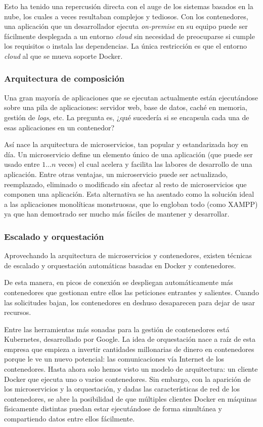 Esto ha tenido una repercusión directa con el auge de los sistemas basados en la
nube, los cuales a veces resultaban complejos y tediosos. Con los contenedores, una
aplicación que un desarrollador ejecuta \textit{on-premise} en su equipo puede
ser fácilmente desplegada a un entorno \textit{cloud} sin necesidad de preocuparse
si cumple los requisitos o instala las dependencias. La única restricción es que el
entorno \textit{cloud} al que se mueva soporte Docker.

\subsubsection*{Arquitectura de composición}
Una gran mayoría de aplicaciones que se ejecutan actualmente están ejecutándose sobre
una pila de aplicaciones: servidor web, base de datos, caché en memoria, gestión de
\textit{logs}, etc. La pregunta es, ¿qué sucedería si se encapsula cada una de esas
aplicaciones en un contenedor?

Así nace la arquitectura de microservicios, tan popular y estandarizada hoy en día.
Un microservicio define un elemento único de una aplicación (que puede ser usado
entre $1 \dots n$ veces) el cual acelera y facilita las labores de desarrollo de una
aplicación. Entre otras ventajas, un microservicio puede ser actualizado, reemplazado,
eliminado o modificado sin afectar al resto de microservicios que componen una
aplicación. Esta alternativa se ha asentado como la solución ideal a las aplicaciones
monolíticas monstruosas, que lo engloban todo (como XAMPP) ya que han demostrado ser
mucho más fáciles de mantener y desarrollar.

\subsubsection*{Escalado y orquestación}
Aprovechando la arquitectura de microservicios y contenedores, existen
técnicas de escalado y orquestación automáticas basadas en Docker y contenedores.

De esta manera, en picos de conexión se despliegan automáticamente más contenedores
que gestionan entre ellos las peticiones entrantes y salientes. Cuando las solicitudes
bajan, los contenedores en deshuso desaparecen para dejar de usar recursos.

Entre las herramientas más sonadas para la gestión de contenedores está
Kubernetes, desarrollado por Google. La idea de orquestación nace a raíz de esta
empresa que empieza a invertir cantidades millonarias de dinero en contenedores porque
le ve un nuevo potencial: las comunicaciones vía Internet de los contenedores.
Hasta ahora solo hemos visto un modelo de arquitectura: un cliente Docker que ejecuta
uno o varios contenedores. Sin embargo, con la aparición de los microservicios y la
orquestación, y dadas las características de red de los contenedores, se abre la
posibilidad de que múltiples clientes Docker en máquinas físicamente distintas puedan
estar ejecutándose de forma simultánea y compartiendo datos entre ellos fácilmente.

